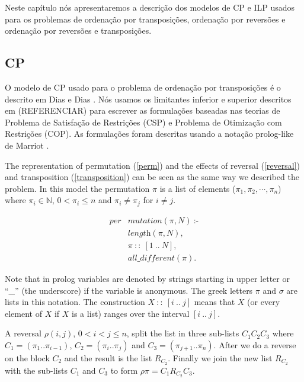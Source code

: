 Neste capítulo nós apresentaremos a descrição dos modelos de CP e ILP
usados para os problemas de ordenação por transposições, ordenação por
reversões e ordenação por reversões e transposições. 

\subsection{CP}
\label{subsec:cp}
O modelo de CP usado para o problema de ordenação por transposições é
o descrito em Dias e Dias \cite{DiasDias*2009}. Nós usamos os
limitantes inferior e superior descritos em (REFERENCIAR) para
escrever as formulações baseadas nas teorias de Problema de Satisfação
de Restrições (CSP) e Problema de Otimização com Restrições (COP). As
formulações foram descritas usando a notação prolog-like de
Marriot \cite{Marriott*1998}.



The representation of permutation (\ref{perm}) and the effects of
reversal (\ref{reversal}) and transposition (\ref{transposition}) can
be seen as the same way we described the problem. In this model the
permutation $\pi$ is a list of elements
($\pi_{1},\pi_{2},\cdots,\pi_{n}$) where $\pi_{i} \in \mathbb{N}$, $0
< \pi_{i} \le n$ and $\pi_{i} \neq \pi_{j}$ for $i \neq j$.

\begin{align}
  \label{perm}
  \textit{per}&\textit{mutation}(\pi, N)~\text{:-} \nonumber\\
  &\textit{length}(\pi, N), \\ 
  &\pi~::~[1~..~N], \nonumber\\
  &\textit{all\_different}(\pi). \nonumber
\end{align}

Note that in prolog variables are denoted by strings starting in upper
letter or ``\_'' (the underscore) if the variable is anonymous. The
greek letters $\pi$ and $\sigma$ are lists in this notation. The
construction $X~::~[i~..~j]$ means that $X$ (or every element of $X$
if $X$ is a list) ranges over the interval $[i~..~j]$.

A reversal $\rho(i,j)$, $0 < i < j \leq n$, split the list in three
sub-lists $C_{1}C_{2}C_{3}$ where $C_{1} = (\pi_{1} .. \pi_{i-1})$,
$C_{2} = (\pi_{i} .. \pi_{j})$ and $C_{3} = (\pi_{j+1} .. \pi_{n})$.
After we do a reverse on the block $C_{2}$ and the result is the list
$R_{C_{2}}$. Finally we join the new list $R_{C_{2}}$ with the
sub-lists $C_{1}$ and $C_{3}$ to form $\rho\pi = C_{1}R_{C_{2}}C_{3}$.

